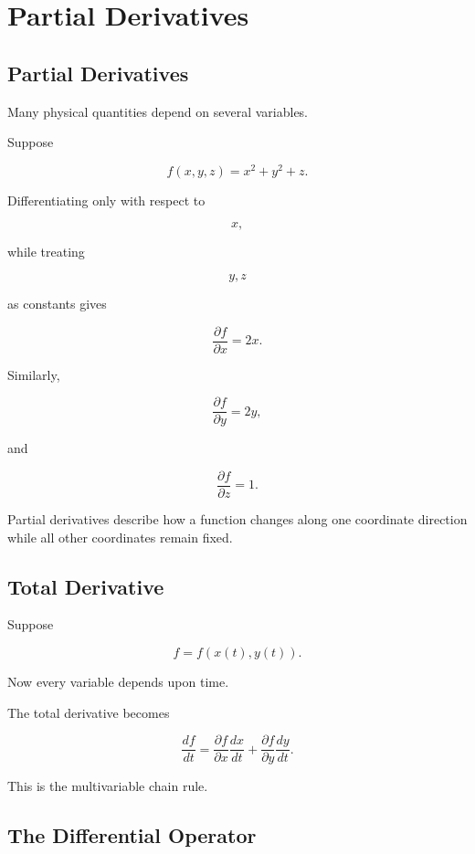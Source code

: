 \section{Partial Derivatives}
\label{sec:partial-derivatives}

\subsection{Partial Derivatives}

Many physical quantities depend on several variables.

Suppose

\[
f(x,y,z)=x^2+y^2+z.
\]

Differentiating only with respect to

\[
x,
\]

while treating

\[
y,z
\]

as constants gives

\[
\boxed{
	\frac{\partial f}{\partial x}=2x.
}
\]

Similarly,

\[
\frac{\partial f}{\partial y}=2y,
\]

and

\[
\frac{\partial f}{\partial z}=1.
\]

Partial derivatives describe how a function changes along one coordinate
direction while all other coordinates remain fixed.


\subsection{Total Derivative}

Suppose

\[
f=f(x(t),y(t)).
\]

Now every variable depends upon time.

The total derivative becomes

\[
\boxed{
	\frac{df}{dt}
	=
	\frac{\partial f}{\partial x}
	\frac{dx}{dt}
	+
	\frac{\partial f}{\partial y}
	\frac{dy}{dt}.
}
\]

This is the multivariable chain rule.


\subsection{The Differential Operator}

